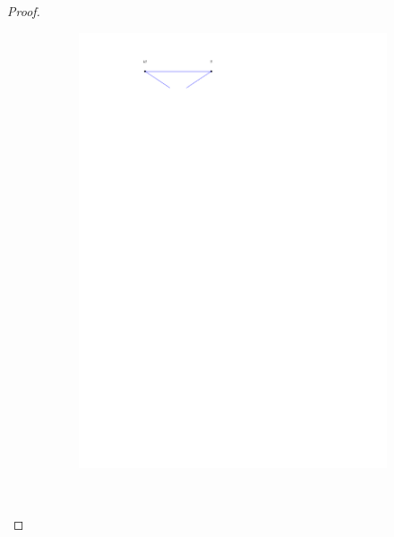\begin{proof}
      \begin{figure}
          \centering
          \begin{subfigure}[b]{0.45 \textwidth}
              \includegraphics[width = \textwidth]{unifiedAlgo/img/sweep/mergeOnBottomFan}
              \caption{}
              \label{fig:sweep:mergeOnBottomFan}
          \end{subfigure}
          ~
          \begin{subfigure}[b]{0.45 \textwidth}

\end{subfigure}
\end{figure}
\end{proof}
